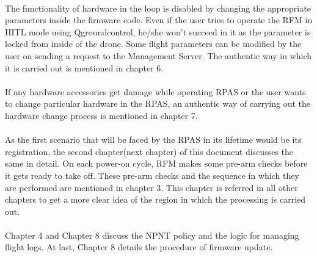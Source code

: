 \documentclass[18pt]{article}
\begin{document}
\\
The functionality of hardware in the loop is disabled by changing the appropriate parameters inside the firmware code. Even if the user tries to operate the RFM in HITL mode using Qgroundcontrol, he/she won't succeed in it as the parameter is locked from inside of the drone.
Some flight parameters can be modified by the user on sending a request to the Management Server. The authentic way in which it is carried out is mentioned in chapter 6.\\
\\
If any hardware accessories get damage while operating RPAS or the user wants to change particular hardware in the RPAS, an authentic way of carrying out the hardware change process is mentioned in chapter 7.\\
\\
As the first scenario that will be faced by the RPAS in its lifetime would be its registration, the second chapter(next chapter) of this document discusses the same in detail. 
On each power-on cycle, RFM makes some pre-arm checks before it gets ready to take off. These pre-arm checks and the sequence in which they are performed are mentioned in chapter 3. This chapter is referred in all other chapters to get a more clear idea of the region in which the processing is carried out.\\
\\
Chapter 4 and Chapter 8 discuss the NPNT policy and the logic for managing flight logs. 
At last, Chapter 8 details the procedure of firmware update.

\newpage
\end{document}
